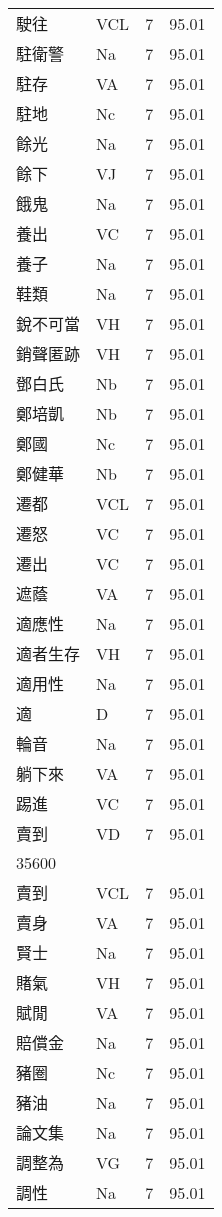 \documentclass[twocolumn]{book}
\begin{document}
\begin{supertabular}{llrr}
駛往 & VCL & 7 &  95.01\\
駐衛警 & Na & 7 &  95.01\\
駐存 & VA & 7 &  95.01\\
駐地 & Nc & 7 &  95.01\\
餘光 & Na & 7 &  95.01\\
餘下 & VJ & 7 &  95.01\\
餓鬼 & Na & 7 &  95.01\\
養出 & VC & 7 &  95.01\\
養子 & Na & 7 &  95.01\\
鞋類 & Na & 7 &  95.01\\
銳不可當 & VH & 7 &  95.01\\
銷聲匿跡 & VH & 7 &  95.01\\
鄧白氏 & Nb & 7 &  95.01\\
鄭培凱 & Nb & 7 &  95.01\\
鄭國 & Nc & 7 &  95.01\\
鄭健華 & Nb & 7 &  95.01\\
遷都 & VCL & 7 &  95.01\\
遷怒 & VC & 7 &  95.01\\
遷出 & VC & 7 &  95.01\\
遮蔭 & VA & 7 &  95.01\\
適應性 & Na & 7 &  95.01\\
適者生存 & VH & 7 &  95.01\\
適用性 & Na & 7 &  95.01\\
適 & D & 7 &  95.01\\
輪音 & Na & 7 &  95.01\\
躺下來 & VA & 7 &  95.01\\
踢進 & VC & 7 &  95.01\\
賣到 & VD & 7 &  95.01\\
35600\\
賣到 & VCL & 7 &  95.01\\
賣身 & VA & 7 &  95.01\\
賢士 & Na & 7 &  95.01\\
賭氣 & VH & 7 &  95.01\\
賦閒 & VA & 7 &  95.01\\
賠償金 & Na & 7 &  95.01\\
豬圈 & Nc & 7 &  95.01\\
豬油 & Na & 7 &  95.01\\
論文集 & Na & 7 &  95.01\\
調整為 & VG & 7 &  95.01\\
調性 & Na & 7 &  95.01\\

\end{supertabular}
\end{document}
